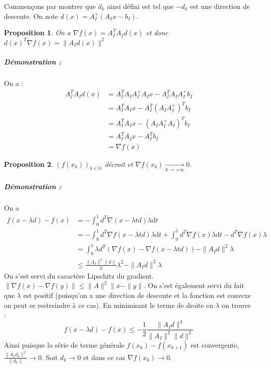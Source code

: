 \documentclass[10pt,a4paper]{article}
\newtheorem{prop}{Proposition}
\begin{document}
Commençons par montrer que $d_k$ ainsi défini est tel que $-d_k$ est une direction de descente.
On note $d(x)=A_I^+(A_I x -b_I)$.
\begin{prop}
On a $\nabla f(x) = A_I^T A_I d(x)$ et donc $d(x)^T \nabla f(x)=\| A_I d(x) \|^2$
\end{prop}
\subparagraph{Démonstration :}
On a :
\begin{equation}
\begin{aligned}
A_I^TA_Id(x)&=A_I^TA_IA_I^+A_Ix -A_I^TA_IA_I^+b_I \\
&=A_I^TA_Ix-A_I^T(A_I A_I^+)^T b_I \\
&=A_I^TA_Ix-(A_I A_I^+ A_I)^T b_I \\
&=A_I^T A_I x -A_I^T b_I \\
&= \nabla f(x)
\end{aligned}
\end{equation}
\begin{prop} $(f(x_k))_{k \in \mathbb{N}}$ décroit et $\nabla f(x_k) \underset{k \rightarrow +\infty}{\rightarrow} 0$.
\end{prop}
\subparagraph{Démonstration :}
On a
\begin{equation}
  \begin{aligned}
    f(x-\lambda d) - f(x)
      &= -\int_0^1  d^T\nabla(x -\lambda  t d) \lambda \text{d}t \\
      &=-\int_0^1  d^T\nabla f(x -\lambda t d) \lambda \text{d}t + \int_0^1  d^T\nabla f(x) \lambda \text{d}t - d^T\nabla f(x) \lambda\\
      &=\int_0^1  \lambda d^T(\nabla f(x) - \nabla f(x -\lambda t d)) - \| A_I d \|^2 \lambda\\
      &\le \frac{\|A_I\|^2 \| d \|}{2} \lambda^2 - \| A_I d \|^2 \lambda
  \end{aligned}
\end{equation}
On s'est servi du caractère Lipschitz du gradient. $\| \nabla f(x) -\nabla f(y) \| \le \|A \|^2 \| x - \| y \|$.
On s'est également servi du fait que $\lambda$ est positif (puisqu'on a une direction de descente et la fonction est convexe on peut se restreindre à ce cas).
En minimisant le terme de droite en $\lambda$ on trouve :
\begin{equation}
f(x-\lambda d)-f(x) \le -\frac{1}{2}\frac{\| A_I d \|^4}{\|A_I \|^2 \|d \|^2}
\end{equation}
Ainsi puisque la série de terme générale $f(x_k)-f(x_{k+1})$ est convergente, $\frac{\| A_I d_k \|^2}{ \|d_k \|} \rightarrow 0$.
Soit $d_k \rightarrow 0$ et dans ce cas $\nabla f (x_k) \rightarrow 0$.
\end{document}
